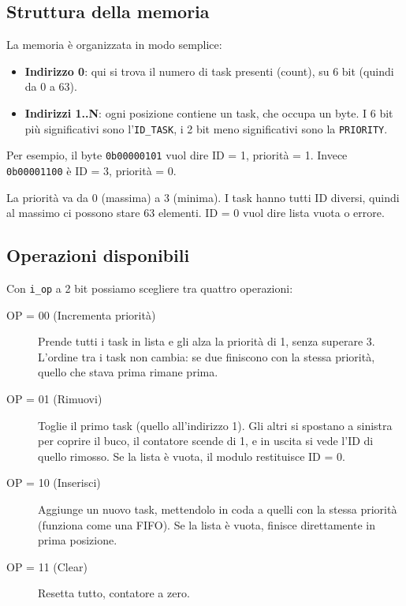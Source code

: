 \documentclass[a4paper,12pt]{article}
\begin{document}
\newpage
\subsection{Struttura della memoria}

La memoria è organizzata in modo semplice:

\begin{itemize}
    \item \textbf{Indirizzo 0}: qui si trova il numero di task presenti (count), su 6 bit (quindi da 0 a 63).
    \item \textbf{Indirizzi 1..N}: ogni posizione contiene un task, che occupa un byte. I 6 bit più significativi sono l'\texttt{ID\_TASK}, i 2 bit meno significativi sono la \texttt{PRIORITY}.
\end{itemize}

Per esempio, il byte \texttt{0b00000101} vuol dire ID = 1, priorità = 1. Invece \texttt{0b00001100} è ID = 3, priorità = 0.

La priorità va da 0 (massima) a 3 (minima). I task hanno tutti ID diversi, quindi al massimo ci possono stare 63 elementi. ID = 0 vuol dire lista vuota o errore.

\subsection{Operazioni disponibili}

Con \texttt{i\_op} a 2 bit possiamo scegliere tra quattro operazioni:

\begin{description}
    \item[OP = 00 (Incrementa priorità)] Prende tutti i task in lista e gli alza la priorità di 1, senza superare 3. L'ordine tra i task non cambia: se due finiscono con la stessa priorità, quello che stava prima rimane prima.
    \item[OP = 01 (Rimuovi)] Toglie il primo task (quello all'indirizzo 1). Gli altri si spostano a sinistra per coprire il buco, il contatore scende di 1, e in uscita si vede l'ID di quello rimosso. Se la lista è vuota, il modulo restituisce ID = 0.
    \item[OP = 10 (Inserisci)] Aggiunge un nuovo task, mettendolo in coda a quelli con la stessa priorità (funziona come una FIFO). Se la lista è vuota, finisce direttamente in prima posizione.
    \item[OP = 11 (Clear)] Resetta tutto, contatore a zero.
\end{description}
\end{document}
